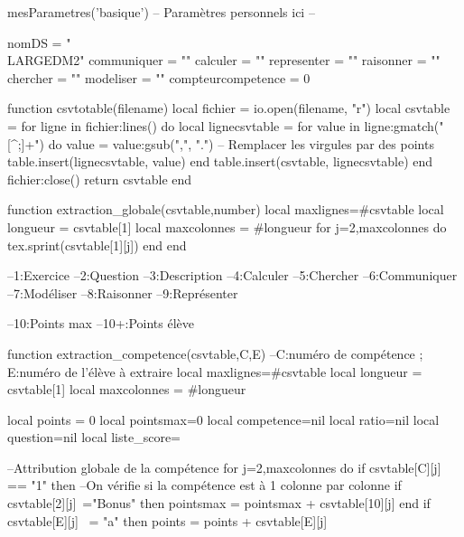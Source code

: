 \documentclass[fiche]{classe-tex3R}
\begin{document}
\begin{luacode}
mesParametres('basique')
-- Paramètres personnels ici --

\end{luacode}
\parametrage


    
    \begin{luacode*}
    nomDS = "\\LARGE{DM2}"
    communiquer = ""
    calculer = ""
    representer = ""
    raisonner = ""
    chercher = ""
    modeliser = ""
    compteurcompetence = 0
    
    function csvtotable(filename)
        local fichier = io.open(filename, "r")
        local csvtable = {}
        for ligne in fichier:lines() do
            local lignecsvtable = {}
            for value in ligne:gmatch("[^;]+") do
                value = value:gsub(",", ".")  -- Remplacer les virgules par des points
                table.insert(lignecsvtable, value) 
            end
            table.insert(csvtable, lignecsvtable) 
        end
        fichier:close()
        return csvtable
    end
    
    
    
    function extraction_globale(csvtable,number)
       local maxlignes=#csvtable
       local longueur = csvtable[1]
       local maxcolonnes = #longueur
       for j=2,maxcolonnes do
          tex.sprint(csvtable[1][j])
       end
    end
    
    --1:Exercice
    --2:Question
    --3:Description
    --4:Calculer
    --5:Chercher
    --6:Communiquer
    --7:Modéliser
    --8:Raisonner
    --9:Représenter
    
    --10:Points max
    --10+:Points élève
    
    function extraction_competence(csvtable,C,E) --C:numéro de compétence ; E:numéro de l'élève à extraire
        local maxlignes=#csvtable
        local longueur = csvtable[1]
        local maxcolonnes = #longueur
    
        local points = 0
        local pointsmax=0
        local competence=nil
        local ratio=nil
        local question=nil
        local liste_score={}
    
    
        --Attribution globale de la compétence
        for j=2,maxcolonnes do
            if csvtable[C][j] == "1" then --On vérifie si la compétence est à 1 colonne par colonne
                if csvtable[2][j]~="Bonus" then
                    pointsmax = pointsmax + csvtable[10][j]
                end
                if csvtable[E][j] ~= "a" then
                    points = points + csvtable[E][j]
    

\end{luacode*}
\end{document}
